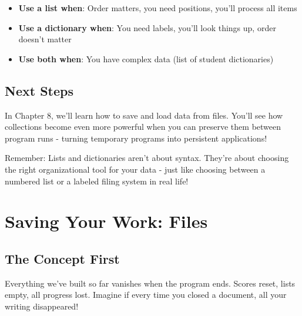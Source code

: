 \documentclass[
  letterpaper,
  DIV=11,
  numbers=noendperiod,
  oneside]{scrreprt}
\providecommand{\tightlist}{%
  \setlength{\itemsep}{0pt}\setlength{\parskip}{0pt}}\usepackage{longtable,booktabs,array}
\begin{document}
\begin{tcolorbox}[enhanced jigsaw, opacityback=0, colback=white, colframe=quarto-callout-tip-color-frame, breakable, titlerule=0mm, coltitle=black, rightrule=.15mm, colbacktitle=quarto-callout-tip-color!10!white, left=2mm, bottomtitle=1mm, bottomrule=.15mm, title=\textcolor{quarto-callout-tip-color}{\faLightbulb}\hspace{0.5em}{Choosing the Right Tool}, opacitybacktitle=0.6, toptitle=1mm, leftrule=.75mm, arc=.35mm, toprule=.15mm]

\begin{itemize}
\tightlist
\item
  \textbf{Use a list when}: Order matters, you need positions, you'll
  process all items
\item
  \textbf{Use a dictionary when}: You need labels, you'll look things
  up, order doesn't matter
\item
  \textbf{Use both when}: You have complex data (list of student
  dictionaries)
\end{itemize}

\end{tcolorbox}

\section{Next Steps}\label{next-steps-7}

In Chapter 8, we'll learn how to save and load data from files. You'll
see how collections become even more powerful when you can preserve them
between program runs - turning temporary programs into persistent
applications!

Remember: Lists and dictionaries aren't about syntax. They're about
choosing the right organizational tool for your data - just like
choosing between a numbered list or a labeled filing system in real
life!

\chapter{Saving Your Work: Files}\label{sec-saving-work}

\section{The Concept First}\label{the-concept-first-7}

Everything we've built so far vanishes when the program ends. Scores
reset, lists empty, all progress lost. Imagine if every time you closed
a document, all your writing disappeared!
\end{document}
